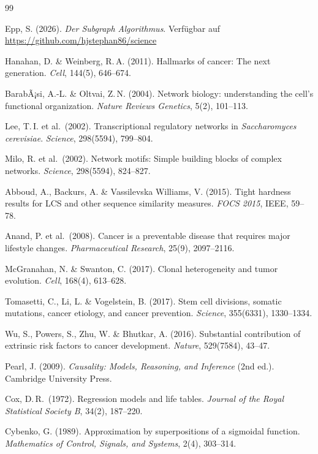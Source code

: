 ﻿\documentclass[12pt, a4paper]{article}
\theoremstyle{definition}
\theoremstyle{remark}
\begin{document}
\begin{thebibliography}{99}

Epp, S. (2026).
\textit{Der Subgraph Algorithmus}. Verfügbar auf
\url{https://github.com/hjstephan86/science}

Hanahan, D. \& Weinberg, R.\,A. (2011).
Hallmarks of cancer: The next generation.
\textit{Cell}, 144(5), 646--674.

BarabÃ¡si, A.-L. \& Oltvai, Z.\,N. (2004).
Network biology: understanding the cell's functional organization.
\textit{Nature Reviews Genetics}, 5(2), 101--113.

Lee, T.\,I. et al.\ (2002).
Transcriptional regulatory networks in \textit{Saccharomyces cerevisiae}.
\textit{Science}, 298(5594), 799--804.

Milo, R. et al.\ (2002).
Network motifs: Simple building blocks of complex networks.
\textit{Science}, 298(5594), 824--827.

Abboud, A., Backurs, A. \& Vassilevska Williams, V. (2015).
Tight hardness results for LCS and other sequence similarity measures.
\textit{FOCS 2015}, IEEE, 59--78.

Anand, P. et al.\ (2008).
Cancer is a preventable disease that requires major lifestyle changes.
\textit{Pharmaceutical Research}, 25(9), 2097--2116.

McGranahan, N. \& Swanton, C. (2017).
Clonal heterogeneity and tumor evolution.
\textit{Cell}, 168(4), 613--628.

Tomasetti, C., Li, L. \& Vogelstein, B. (2017).
Stem cell divisions, somatic mutations, cancer etiology, and cancer prevention.
\textit{Science}, 355(6331), 1330--1334.

Wu, S., Powers, S., Zhu, W. \& Bhutkar, A. (2016).
Substantial contribution of extrinsic risk factors to cancer development.
\textit{Nature}, 529(7584), 43--47.

Pearl, J. (2009).
\textit{Causality: Models, Reasoning, and Inference} (2nd ed.).
Cambridge University Press.

Cox, D.\,R.\ (1972).
Regression models and life tables.
\textit{Journal of the Royal Statistical Society B}, 34(2), 187--220.

Cybenko, G. (1989).
Approximation by superpositions of a sigmoidal function.
\textit{Mathematics of Control, Signals, and Systems}, 2(4), 303--314.

\end{thebibliography}
\end{document}
